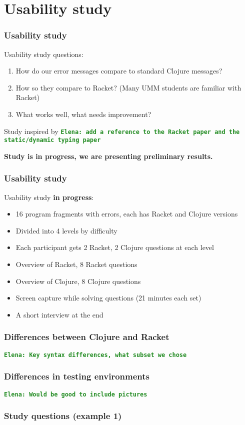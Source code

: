 \documentclass{beamer}
\newcommand{\comment}[1]{{\bf \tt  {#1}}}
\newcommand{\emcomment}[1]{\textcolor{ForestGreen}{\comment{Elena: {#1}}}}
\begin{document}
\section{Usability study}

\begin{frame}
\frametitle{Usability study}
Usability study questions:
\begin{enumerate}
\item How do our error messages compare to standard Clojure messages?
\item How so they compare to Racket? (Many UMM students are familiar with Racket)
\item What works well, what needs improvement? 
\end{enumerate}
Study inspired by \emcomment{add a reference to the Racket paper and the static/dynamic typing paper}

{\bf Study is in progress, we are presenting preliminary results.}
\end{frame}

\begin{frame}
\frametitle{Usability study}
Usability study {\bf in progress}:
\begin{itemize}
\item 16 program fragments with errors, each has Racket and Clojure versions 
\item Divided into 4 levels by difficulty
\item Each participant gets 2 Racket, 2 Clojure questions at each level
\item Overview of Racket, 8 Racket questions
\item Overview of Clojure, 8 Clojure questions
\item Screen capture while solving questions (21 minutes each set)
\item A short interview at the end
\end{itemize}
\end{frame}

\begin{frame}
\frametitle{ Differences between Clojure and Racket}
\emcomment{Key syntax differences, what subset we chose}
\end{frame}

\begin{frame}
\frametitle{ Differences in testing environments}
\emcomment{Would be good to include pictures}
\end{frame}

\begin{frame}
\frametitle{Study questions (example 1)}

\end{frame}
\end{document}
